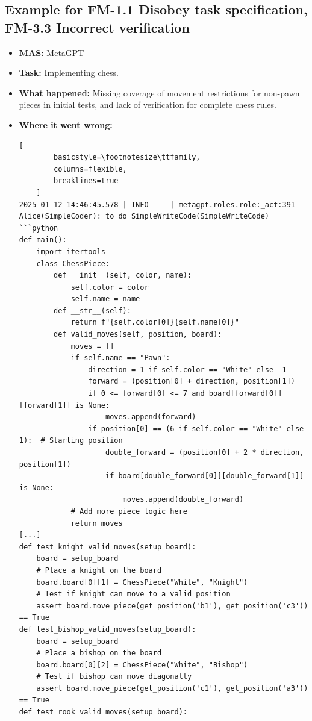 \subsection{Example for FM-1.1 Disobey task specification, FM-3.3 Incorrect verification}\label{ex:fm1.1}
\begin{itemize}
    \item \textbf{MAS:} MetaGPT
    \item \textbf{Task:} Implementing chess. 
    \item \textbf{What happened:} Missing coverage of movement restrictions for non-pawn pieces in initial tests, and lack of verification for complete chess rules.
    \item \textbf{Where it went wrong:}
    \begin{lstlisting}[
        basicstyle=\footnotesize\ttfamily,
        columns=flexible,
        breaklines=true
    ]
2025-01-12 14:46:45.578 | INFO     | metagpt.roles.role:_act:391 - Alice(SimpleCoder): to do SimpleWriteCode(SimpleWriteCode)
```python
def main():
    import itertools
    class ChessPiece:
        def __init__(self, color, name):
            self.color = color
            self.name = name
        def __str__(self):
            return f"{self.color[0]}{self.name[0]}"
        def valid_moves(self, position, board):
            moves = []
            if self.name == "Pawn":
                direction = 1 if self.color == "White" else -1
                forward = (position[0] + direction, position[1])
                if 0 <= forward[0] <= 7 and board[forward[0]][forward[1]] is None:
                    moves.append(forward)
                if position[0] == (6 if self.color == "White" else 1):  # Starting position
                    double_forward = (position[0] + 2 * direction, position[1])
                    if board[double_forward[0]][double_forward[1]] is None:
                        moves.append(double_forward)
            # Add more piece logic here
            return moves
[...]
def test_knight_valid_moves(setup_board):
    board = setup_board
    # Place a knight on the board
    board.board[0][1] = ChessPiece("White", "Knight")
    # Test if knight can move to a valid position
    assert board.move_piece(get_position('b1'), get_position('c3')) == True
def test_bishop_valid_moves(setup_board):
    board = setup_board
    # Place a bishop on the board
    board.board[0][2] = ChessPiece("White", "Bishop")
    # Test if bishop can move diagonally
    assert board.move_piece(get_position('c1'), get_position('a3')) == True
def test_rook_valid_moves(setup_board):

\end{lstlisting}
\end{itemize}
